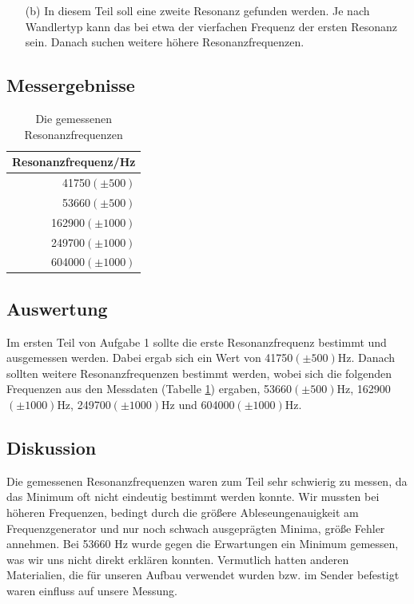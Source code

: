 \documentclass[12pt]{scrartcl}
\begin{document}
\begin{itemize}
\begin{figure}[htbp]
  	\caption[Schaltskizze des Versuchsaufbaus]{Schaltskizze des Versuchsaufbaus\footnotemark}
  \label{fig:impedanz}
\end{figure}
Wir verändern dann die Frequenz des Funktionsgenerators und messen die niedrigste Resonanzfrequenz (etwa 40 kHz)
aus. Im Resonanzfall erwarten wir maximalen Strom durch den 1-k$\Omega$-Widerstand. 
\item[(b)]
In diesem Teil soll eine zweite Resonanz gefunden werden. Je nach Wandlertyp kann das bei etwa der vierfachen Frequenz der ersten Resonanz sein. Danach suchen weitere höhere
Resonanzfrequenzen.
\end{itemize}
\subsection{Messergebnisse}
\begin{table}[H]
\caption{Die gemessenen Resonanzfrequenzen}
\begin{center}
\begin{tabular}{|r|}
\hline
Resonanzfrequenz/Hz \\ \hline
41750$(\pm 500)$ \\ \hline
53660$(\pm 500)$ \\ \hline
162900$(\pm 1000)$ \\ \hline
249700$(\pm 1000)$ \\ \hline
604000$(\pm 1000)$ \\ \hline
\end{tabular}
\end{center}
\label{tab:aufgabe1}
\end{table}
\subsection{Auswertung}
Im ersten Teil von Aufgabe 1 sollte die erste Resonanzfrequenz bestimmt und ausgemessen werden. Dabei ergab sich ein Wert von 41750$(\pm 500)$Hz. Danach sollten weitere Resonanzfrequenzen bestimmt werden, wobei sich die folgenden Frequenzen  aus den Messdaten (Tabelle \ref{tab:aufgabe1}) ergaben, 53660$(\pm 500)$Hz, 162900$(\pm 1000)$Hz, 249700$(\pm 1000)$Hz und 604000$(\pm 1000)$Hz.
\subsection{Diskussion}
Die gemessenen Resonanzfrequenzen waren zum Teil sehr schwierig zu messen, da das Minimum oft nicht eindeutig bestimmt werden konnte.
Wir mussten bei höheren Frequenzen, bedingt durch die größere Ableseungenauigkeit am Frequenzgenerator und nur noch schwach ausgeprägten Minima, größe Fehler annehmen.
Bei 53660 Hz wurde gegen die Erwartungen ein Minimum gemessen, was wir uns nicht direkt erklären konnten. Vermutlich hatten anderen Materialien, die für unseren Aufbau verwendet wurden bzw. im Sender befestigt waren einfluss auf unsere Messung. 
\end{document}
